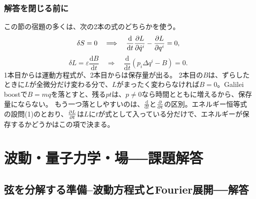 \documentclass[paper=b5j,fontsize=11Q,jafontsize=11Q,baselineskip=19Q]{jlreq}
\newcommand{\runningtitle}{章題未定}
\newcommand{\dd}{\mathrm{d}}
\numberwithin{equation}{section}
\begin{document}
\subsubsection*{解答を閉じる前に}

この節の宿題の多くは、次の2本の式のどちらかを使う。
\begin{equation}
  \delta S=0
  \quad\Longrightarrow\quad
  \frac{\dd}{\dd t}\pder{L}{\dot q^i}-\pder{L}{q^i}=0,
\end{equation}
\begin{equation}
  \delta L=\varepsilon\frac{\dd B}{\dd t}
  \quad\Longrightarrow\quad
  \frac{\dd}{\dd t}(p_i\Delta q^i-B)=0.
\end{equation}
1本目からは運動方程式が、2本目からは保存量が出る。
2本目の$B$は、ずらしたときに$L$が全微分だけ変わる分で、$L$がまったく変わらなければ$B=0$。Galilei boostで$B=mq$を落とすと、残る$pt$は、$p\ne0$なら時間とともに増えるから、保存量にならない。
もう一つ落としやすいのは、$\frac{\dd}{\dd t}$と$\pder{}{t}$の区別。エネルギー恒等式の設問(1)のとおり、$\pder Lt$は$L$に$t$が式として入っている分だけで、エネルギーが保存するかどうかはこの項で決まる。


\clearpage
\endgroup
\begingroup
\renewcommand{\runningtitle}{解答 第3章　波動・量子力学・場}
\newcommand{\pder}[2]{\frac{\partial #1}{\partial #2}}
\newcommand{\Tens}{\mathcal T}
\newcommand{\Eden}{\mathcal E}
\newcommand{\Jflux}{\mathcal J}
\renewcommand{\runningtitle}{解答 第3章　波動・量子力学・場}
\section[波動・量子力学・場　課題解答]{波動・量子力学・場──課題解答}
\subsection[弦を分解する準備]{弦を分解する準備--波動方程式とFourier展開──解答}
\end{document}
